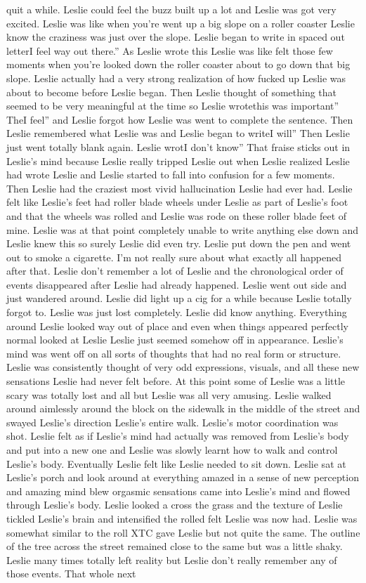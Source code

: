 \documentclass[12pt]{book}
\begin{document}
quit a while. Leslie could feel the buzz built up a lot and Leslie was got very excited. Leslie was like when you're went up a big slope on a roller coaster Leslie know the craziness was just over the slope. Leslie began to write in spaced out letterI feel way out there.'' As Leslie wrote this Leslie was like felt those few moments when you're looked down the roller coaster about to go down that big slope. Leslie actually had a very strong realization of how fucked up Leslie was about to become before Leslie began. Then Leslie thought of something that seemed to be very meaningful at the time so Leslie wrotethis was important'' TheI feel'' and Leslie forgot how Leslie was went to complete the sentence. Then Leslie remembered what Leslie was and Leslie began to writeI will'' Then Leslie just went totally blank again. Leslie wrotI don't know'' That fraise sticks out in Leslie's mind because Leslie really tripped Leslie out when Leslie realized Leslie had wrote Leslie and Leslie started to fall into confusion for a few moments. Then Leslie had the craziest most vivid hallucination Leslie had ever had. Leslie felt like Leslie's feet had roller blade wheels under Leslie as part of Leslie's foot and that the wheels was rolled and Leslie was rode on these roller blade feet of mine. Leslie was at that point completely unable to write anything else down and Leslie knew this so surely Leslie did even try. Leslie put down the pen and went out to smoke a cigarette. I'm not really sure about what exactly all happened after that. Leslie don't remember a lot of Leslie and the chronological order of events disappeared after Leslie had already happened. Leslie went out side and just wandered around. Leslie did light up a cig for a while because Leslie totally forgot to. Leslie was just lost completely. Leslie did know anything. Everything around Leslie looked way out of place and even when things appeared perfectly normal looked at Leslie Leslie just seemed somehow off in appearance. Leslie's mind was went off on all sorts of thoughts that had no real form or structure. Leslie was consistently thought of very odd expressions, visuals, and all these new sensations Leslie had never felt before. At this point some of Leslie was a little scary was totally lost and all but Leslie was all very amusing. Leslie walked around aimlessly around the block on the sidewalk in the middle of the street and swayed Leslie's direction Leslie's entire walk. Leslie's motor coordination was shot. Leslie felt as if Leslie's mind had actually was removed from Leslie's body and put into a new one and Leslie was slowly learnt how to walk and control Leslie's body. Eventually Leslie felt like Leslie needed to sit down. Leslie sat at Leslie's porch and look around at everything amazed in a sense of new perception and amazing mind blew orgasmic sensations came into Leslie's mind and flowed through Leslie's body. Leslie looked a cross the grass and the texture of Leslie tickled Leslie's brain and intensified the rolled felt Leslie was now had. Leslie was somewhat similar to the roll XTC gave Leslie but not quite the same. The outline of the tree across the street remained close to the same but was a little shaky. Leslie many times totally left reality but Leslie don't really remember any of those events. That whole next 
\end{document}
